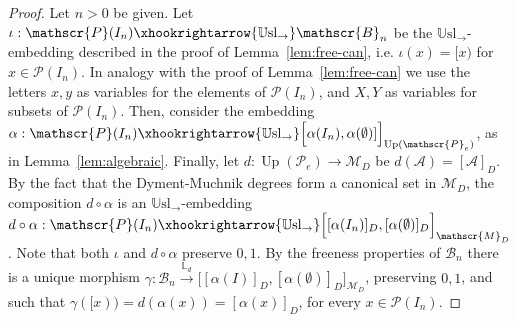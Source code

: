 \documentclass[11pt]{amsart}
\DeclareMathOperator{\up}{Up}
\newcommand{\Usl}{\mathbb{U}\textrm{sl}}
\begin{document}
\begin{proof}
Let $n>0$ be given. Let $\iota: \mathscr{P}(I_n) \xhookrightarrow 
{\Usl_{\rightarrow}}\mathscr{B}_n$ be the $\Usl_{\rightarrow}$-embedding 
described in the proof of Lemma~\ref{lem:free-can}, i.e. $\iota(x)=[x)$ for 
$x \in \mathscr{P}(I_n)$. In analogy with the proof of 
Lemma~\ref{lem:free-can} we use the letters $x,y$ as variables for the 
elements of $\mathscr{P}(I_n)$, and $X,Y$ as variables for subsets of 
$\mathscr{P}(I_n)$. Then,  consider the embedding $\alpha: \mathscr{P}(I_n) 
\xhookrightarrow{\Usl_{\rightarrow}} \Big[\alpha(I_n), \alpha(\emptyset)] 
\Big]_{\up(\mathscr{P}_e)}$, as in Lemma~\ref{lem:algebraic}. Finally, let 
$d: \up(\mathscr{P}_e) \rightarrow \mathscr{M}_D$ be 
$d(\mathcal{A})=[\mathcal{A}]_D$. By the fact that the Dyment-Muchnik degrees 
form a canonical set in $\mathscr{M}_D$, the composition $d\circ \alpha$ is 
an $\Usl_{\rightarrow}$-embedding $d\circ \alpha: \mathscr{P}(I_n) 
\xhookrightarrow{\Usl_{\rightarrow}} \Big[[\alpha(I_n)]_D, 
[\alpha(\emptyset)]_D \Big]_{\mathscr{M}_D}$. Note that both $\iota$ and 
$d\circ \alpha$ preserve $0, 1$. By the freeness properties of 
$\mathscr{B}_n$ there is a unique morphism $\gamma: \mathscr{B}_n 
\overset{\mathbb{L}_d}{\longrightarrow} \Big[[\alpha(I)]_D, 
[\alpha(\emptyset)]_D \Big]_{\mathscr{M}_D}$, preserving $0,1$, and  such 
that $\gamma([x))=d(\alpha(x))=[\alpha(x)]_D$, for every  $x \in 
\mathscr{P}(I_n)$. 


\end{proof}
\end{document}
